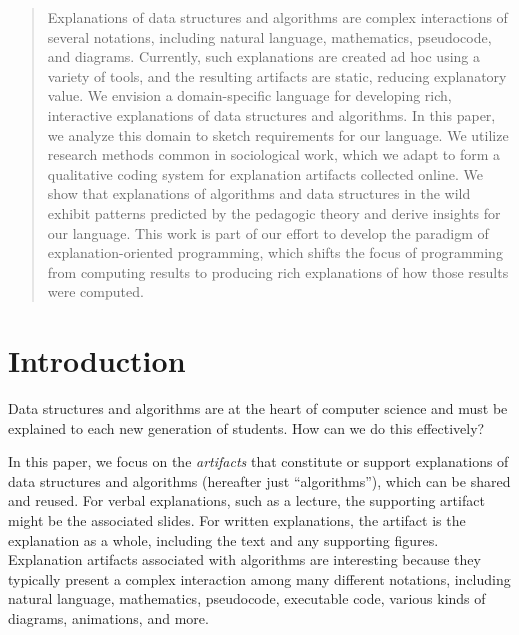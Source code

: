 \documentclass[sigconf]{acmart}
\begin{document}



\maketitle

\begin{abstract}
  Explanations of data structures and algorithms are complex interactions of
  several notations, including natural language, mathematics, pseudocode, and
  diagrams. Currently, such explanations are created ad hoc using a variety of
  tools, and the resulting artifacts are static, reducing explanatory value. We
  envision a domain-specific language for developing rich, interactive
  explanations of data structures and algorithms. In this paper, we analyze this
  domain to sketch requirements for our language. We utilize research methods
  common in sociological work, which we adapt to form a qualitative coding
  system for explanation artifacts collected online. We show that explanations
  of algorithms and data structures in the wild exhibit patterns predicted by
  the pedagogic theory and derive insights for our language. This work is part
  of our effort to develop the paradigm of explanation-oriented programming,
  which shifts the focus of programming from computing results to producing rich
  explanations of how those results were computed.
\end{abstract}

\section{Introduction}
\label{sec:intro}

Data structures and algorithms are at the heart of computer science and must be
explained to each new generation of students. How can we do this effectively?


In this paper, we focus on the \emph{artifacts} that constitute or support
explanations of data structures and algorithms (hereafter just ``algorithms''),
which can be shared and reused.
%
For verbal explanations, such as a lecture, the supporting artifact might be
the associated slides. For written explanations, the artifact is the
explanation as a whole, including the text and any supporting figures.
%
Explanation artifacts associated with algorithms are interesting because they
typically present a complex interaction among many different notations,
including natural language, mathematics, pseudocode, executable code, various
kinds of diagrams, animations, and more.
\end{document}
